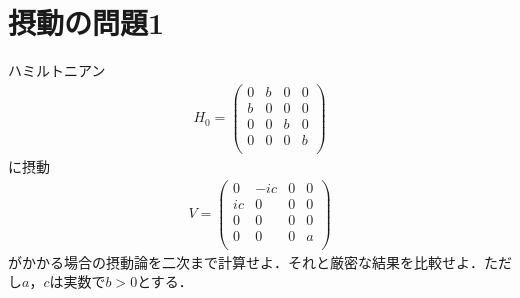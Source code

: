 \documentclass[a4j]{jarticle}
\begin{document}
\section{摂動の問題1}
ハミルトニアン
\begin{align*}
 H_0=\left(
 \begin{array}{cccc}
  0&b &0 &0 \\
  b&0 &0 &0 \\
  0&0 &b &0 \\
  0&0 &0 &b \\
 \end{array}\right)
\end{align*}
に摂動
\begin{align*}
 V=\left(
 \begin{array}{cccc}
  0&-ic &0 &0 \\
  ic&0 &0 &0 \\
  0&0 &0 &0 \\
  0&0 &0 &a \\
 \end{array}\right)
\end{align*}
がかかる場合の摂動論を二次まで計算せよ．それと厳密な結果を比較せよ．ただし$a$，$c$は実数で$b>0$とする．
\end{document}
